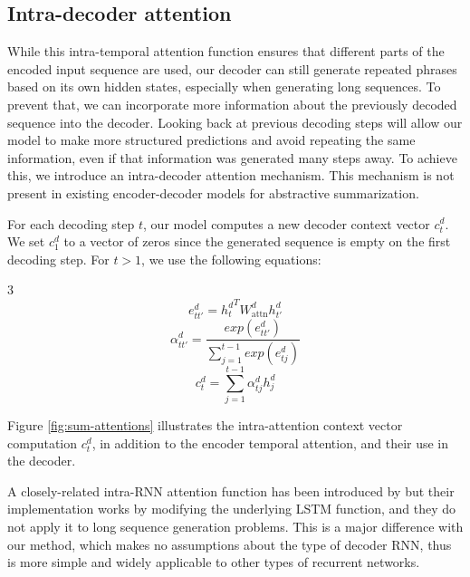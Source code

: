 \subsection{Intra-decoder attention}
\label{ssec:intra-attention}

While this intra-temporal attention function ensures that different parts of the encoded input sequence are used, our decoder can still generate repeated phrases based on its own hidden states, especially when generating long sequences. To prevent that, we can incorporate more information about the previously decoded sequence into the decoder. Looking back at previous decoding steps will allow our model to make more structured predictions and avoid repeating the same information, even if that information was generated many steps away. To achieve this, we introduce an intra-decoder attention mechanism. This mechanism is not present in existing encoder-decoder models for abstractive summarization.

For each decoding step $t$, our model computes a new decoder context vector $c^d_t$. We set $c^d_1$ to a vector of zeros since the generated sequence is empty on the first decoding step. For $t > 1$, we use the following equations:

\begin{multicols}{3}
\begin{equation}
e^d_{tt'} = {h^d_t}^T W^d_\textrm{attn} h^d_{t'}
\label{eq:intra-attention}
\end{equation}
\begin{equation}
\alpha^d_{tt'} = \frac{exp(e^d_{tt'})}{\sum_{j=1}^{t-1} exp(e^d_{tj})}
\label{eq:intra-attention-weights-softmax}
\end{equation}
\begin{equation}
c^d_t = \sum_{j=1}^{t-1} \alpha^d_{tj} h^d_j
\label{eq:intra-attention-context}
\end{equation}
\end{multicols}

Figure \ref{fig:sum-attentions} illustrates the intra-attention context vector computation $c^d_t$, in addition to the encoder temporal attention, and their use in the decoder.

A closely-related intra-RNN attention function has been introduced by \citet{cheng2016} but their implementation works by modifying the underlying LSTM function, and they do not apply it to long sequence generation problems. This is a major difference with our method, which makes no assumptions about the type of decoder RNN, thus is more simple and widely applicable to other types of recurrent networks.

